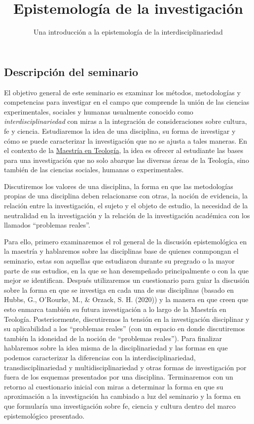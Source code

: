 \documentclass[spanish,]{article}
\title{Epistemología de la investigación}
\author{Una introducción a la epistemología de la interdisciplinariedad}
\date{}
\begin{document}
\maketitle

\subsection{Descripción del
seminario}\label{descripciuxf3n-del-seminario}

El objetivo general de este seminario es examinar los métodos,
metodologías y competencias para investigar en el campo que comprende la
unión de las ciencias experimentales, sociales y humanas usualmente
conocido como \emph{interdisciplinariedad} con miras a la integración de
consideraciones sobre cultura, fe y ciencia. Estudiaremos la idea de una
disciplina, su forma de investigar y cómo se puede caracterizar la
investigación que no se ajusta a tales maneras. En el contexto de la
\href{https://www.unisabana.edu.co/index.php?id=12310}{Maestría en
Teología}, la idea es ofrecer al estudiante las bases para una
investigación que no solo abarque las diversas áreas de la Teología,
sino también de las ciencias sociales, humanas o experimentales.

Discutiremos los valores de una disciplina, la forma en que las
metodologías propias de una disciplina deben relacionarse con otras, la
noción de evidencia, la relación entre la investigación, el sujeto y el
objeto de estudio, la necesidad de la neutralidad en la investigación y
la relación de la investigación académica con los llamados ``problemas
reales''.

Para ello, primero examinaremos el rol general de la discusión
epistemológica en la maestría y hablaremos sobre las disciplinas base de
quienes conmpongan el seminario, estas son aquellas que estudiaron
durante su pregrado o la mayor parte de sus estudios, en la que se han
desempeñado principalmente o con la que mejor se identifican. Después
utilizaremos un cuestionario para guiar la discusión sobre la forma en
que se investiga en cada una de sus disciplinas (basado en Hubbs, G.,
O'Rourke, M., \& Orzack, S. H. (2020)) y la manera en que creen que esto
enmarca también su futura investigación a lo largo de la Maestría en
Teología. Posteriormente, discutiremos la tensión en la investigación
disciplinar y su aplicabilidad a los ``problemas reales'' (con un
espacio en donde discutiremos también la idoneidad de la noción de
``problemas reales''). Para finalizar hablaremos sobre la idea misma de
la disciplinariedad y las formas en que podemos caracterizar la
diferencias con la interdisciplinariedad, transdisciplinariedad y
multidisciplinariedad y otras formas de investigación por fuera de los
esquemas presentados por una disciplina. Terminaremos con un retorno al
cuestionario inicial con miras a determinar la forma en que su
aproximación a la investigación ha cambiado a luz del seminario y la
forma en que formularía una investigación sobre fe, ciencia y cultura
dentro del marco epistemológico presentado.
\end{document}
